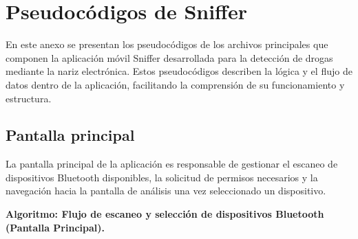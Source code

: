 \chapter{Pseudocódigos de Sniffer}
En este anexo se presentan los pseudocódigos de los archivos principales que componen la aplicación móvil Sniffer desarrollada para la detección de drogas mediante la nariz electrónica. Estos pseudocódigos describen la lógica y el flujo de datos dentro de la aplicación, facilitando la comprensión de su funcionamiento y estructura.

\section{Pantalla principal}

La pantalla principal de la aplicación es responsable de gestionar el escaneo de dispositivos Bluetooth disponibles, la solicitud de permisos necesarios y la navegación hacia la pantalla de análisis una vez seleccionado un dispositivo.
\par

\noindent\textbf{Algoritmo: Flujo de escaneo y selección de dispositivos Bluetooth (Pantalla Principal).}

